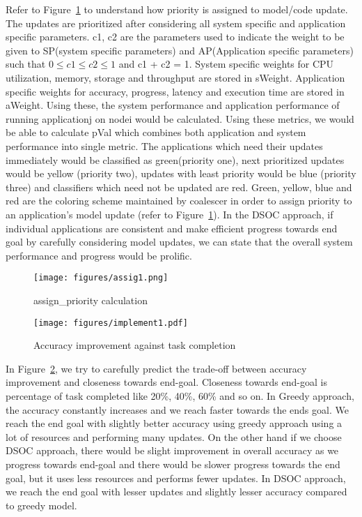 Refer to Figure~\ref{fig:assprior} to understand how priority is assigned to model/code update. The updates are prioritized after considering all system specific and application specific parameters. c1, c2 are the parameters used to indicate the weight to be given to SP(system specific parameters) and AP(Application specific parameters) such that $0\le{c1} \le {c2} \le {1}$ and c1 + c2 = 1. 
System specific weights for CPU utilization, memory, storage and throughput are stored in sWeight. Application specific weights for accuracy, progress, latency and execution time are stored in aWeight. Using these, the system performance and application performance of running application\-j on node\-i would be calculated. Using these metrics, we would be able to calculate pVal which combines both application and system performance into single metric. The applications which need their updates immediately would be classified as green(priority one), next prioritized updates would be yellow (priority two), updates with least priority would be blue (priority three) and classifiers which need not be updated are red. Green, yellow, blue and red are the coloring scheme maintained by coalescer in order to assign priority to an application's model update (refer to Figure~\ref{fig:assprior}).
In the DSOC approach, if individual applications are consistent and make efficient progress towards end goal by carefully considering model updates, we can state that the overall system performance and progress would be prolific.

\begin{figure}
    \centering
    \texttt{[image: figures/assig1.png]}
    \caption{assign\_priority calculation}
    \label{fig:assprior}
\end{figure}

\begin{figure}
    \centering
    \texttt{[image: figures/implement1.pdf]}
    \caption{Accuracy improvement against task completion}
    \label{fig:implement2pred}
\end{figure}

In Figure~\ref{fig:implement2pred}, we try to carefully predict the trade-off between accuracy improvement and closeness towards end-goal. Closeness towards end-goal is percentage of task completed like 20\%, 40\%, 60\% and so on. In Greedy approach, the accuracy constantly increases and we reach faster towards the ends goal. We reach the end goal with slightly better accuracy using greedy approach using a lot of resources and performing many updates. On the other hand if we choose DSOC approach, there would be slight improvement in overall accuracy as we progress towards end-goal and there would be slower progress towards the end goal, but it uses less resources and performs fewer updates. In DSOC approach, we reach the end goal with lesser updates and slightly lesser accuracy compared to greedy model.  


